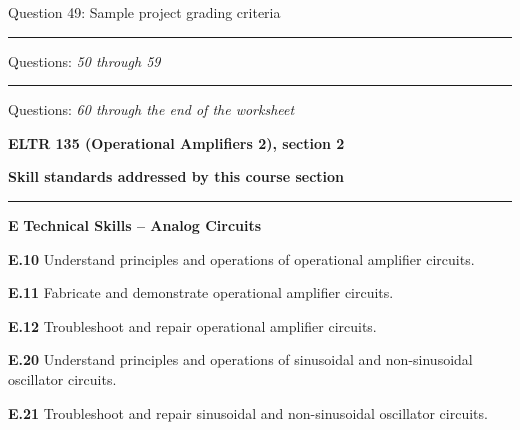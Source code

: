 \hskip 10pt Question 49: Sample project grading criteria
 
\vskip 10pt
\hrule \vskip 5pt
\noindent
{}

\hskip 10pt Questions: {\it 50 through 59}
 
\vskip 10pt
\hrule \vskip 5pt
\noindent
{}

\hskip 10pt Questions: {\it 60 through the end of the worksheet}
 
\vskip 10pt








\vfil \eject

\centerline{\bf ELTR 135 (Operational Amplifiers 2), section 2} \bigskip 
 
\vskip 10pt

\noindent
{\bf Skill standards addressed by this course section}

\vskip 5pt

\hrule \vskip 10pt
\noindent
{}

\vskip 5pt

\medskip
\item{\bf E} {\bf Technical Skills -- Analog Circuits}
\item{\bf E.10} Understand principles and operations of operational amplifier circuits.
\item{\bf E.11} Fabricate and demonstrate operational amplifier circuits.
\item{\bf E.12} Troubleshoot and repair operational amplifier circuits.
\item{\bf E.20} Understand principles and operations of sinusoidal and non-sinusoidal oscillator circuits.
\item{\bf E.21} Troubleshoot and repair sinusoidal and non-sinusoidal oscillator circuits.
\medskip

\vskip 5pt

